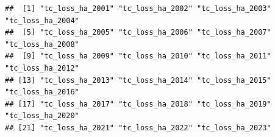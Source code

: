\documentclass[
]{article}
\newenvironment{Shaded}{\begin{snugshade}}{\end{snugshade}}
\newcommand{\AttributeTok}[1]{\textcolor[rgb]{0.13,0.29,0.53}{#1}}
\newcommand{\FunctionTok}[1]{\textcolor[rgb]{0.13,0.29,0.53}{\textbf{#1}}}
\newcommand{\NormalTok}[1]{#1}
\newcommand{\SpecialCharTok}[1]{\textcolor[rgb]{0.81,0.36,0.00}{\textbf{#1}}}
\newcommand{\StringTok}[1]{\textcolor[rgb]{0.31,0.60,0.02}{#1}}
\begin{document}
\begin{Shaded}
\end{Shaded}

\begin{verbatim}
##  [1] "tc_loss_ha_2001" "tc_loss_ha_2002" "tc_loss_ha_2003" "tc_loss_ha_2004"
##  [5] "tc_loss_ha_2005" "tc_loss_ha_2006" "tc_loss_ha_2007" "tc_loss_ha_2008"
##  [9] "tc_loss_ha_2009" "tc_loss_ha_2010" "tc_loss_ha_2011" "tc_loss_ha_2012"
## [13] "tc_loss_ha_2013" "tc_loss_ha_2014" "tc_loss_ha_2015" "tc_loss_ha_2016"
## [17] "tc_loss_ha_2017" "tc_loss_ha_2018" "tc_loss_ha_2019" "tc_loss_ha_2020"
## [21] "tc_loss_ha_2021" "tc_loss_ha_2022" "tc_loss_ha_2023"
\end{verbatim}
\end{document}
